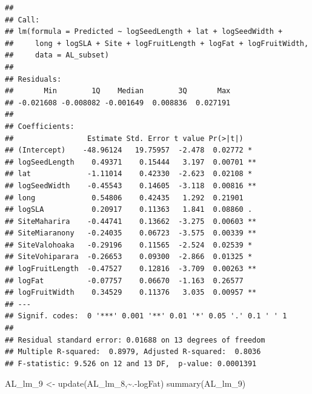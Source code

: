 \documentclass[
  12pt,
]{article}
\newenvironment{Shaded}{\begin{snugshade}}{\end{snugshade}}
\newcommand{\FunctionTok}[1]{\textcolor[rgb]{0.00,0.00,0.00}{#1}}
\newcommand{\NormalTok}[1]{#1}
\newcommand{\OtherTok}[1]{\textcolor[rgb]{0.56,0.35,0.01}{#1}}
\newcommand{\SpecialCharTok}[1]{\textcolor[rgb]{0.00,0.00,0.00}{#1}}
\begin{document}
\begin{verbatim}
## 
## Call:
## lm(formula = Predicted ~ logSeedLength + lat + logSeedWidth + 
##     long + logSLA + Site + logFruitLength + logFat + logFruitWidth, 
##     data = AL_subset)
## 
## Residuals:
##       Min        1Q    Median        3Q       Max 
## -0.021608 -0.008082 -0.001649  0.008836  0.027191 
## 
## Coefficients:
##                 Estimate Std. Error t value Pr(>|t|)   
## (Intercept)    -48.96124   19.75957  -2.478  0.02772 * 
## logSeedLength    0.49371    0.15444   3.197  0.00701 **
## lat             -1.11014    0.42330  -2.623  0.02108 * 
## logSeedWidth    -0.45543    0.14605  -3.118  0.00816 **
## long             0.54806    0.42435   1.292  0.21901   
## logSLA           0.20917    0.11363   1.841  0.08860 . 
## SiteMaharira    -0.44741    0.13662  -3.275  0.00603 **
## SiteMiaranony   -0.24035    0.06723  -3.575  0.00339 **
## SiteValohoaka   -0.29196    0.11565  -2.524  0.02539 * 
## SiteVohiparara  -0.26653    0.09300  -2.866  0.01325 * 
## logFruitLength  -0.47527    0.12816  -3.709  0.00263 **
## logFat          -0.07757    0.06670  -1.163  0.26577   
## logFruitWidth    0.34529    0.11376   3.035  0.00957 **
## ---
## Signif. codes:  0 '***' 0.001 '**' 0.01 '*' 0.05 '.' 0.1 ' ' 1
## 
## Residual standard error: 0.01688 on 13 degrees of freedom
## Multiple R-squared:  0.8979, Adjusted R-squared:  0.8036 
## F-statistic: 9.526 on 12 and 13 DF,  p-value: 0.0001391
\end{verbatim}

\begin{Shaded}
\begin{Highlighting}[]
\NormalTok{AL\_lm\_9 }\OtherTok{\textless{}{-}} \FunctionTok{update}\NormalTok{(AL\_lm\_8,}\SpecialCharTok{\textasciitilde{}}\NormalTok{.}\SpecialCharTok{{-}}\NormalTok{logFat)}
\FunctionTok{summary}\NormalTok{(AL\_lm\_9)}
\end{Highlighting}
\end{Shaded}
\end{document}
